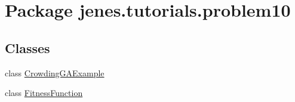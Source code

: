 \hypertarget{namespacejenes_1_1tutorials_1_1problem10}{\section{Package jenes.\-tutorials.\-problem10}
\label{namespacejenes_1_1tutorials_1_1problem10}
}
\subsection*{Classes}
\begin{DoxyCompactItemize}
\item 
class \hyperlink{classjenes_1_1tutorials_1_1problem10_1_1_crowding_g_a_example}{Crowding\-G\-A\-Example}
\item 
class \hyperlink{classjenes_1_1tutorials_1_1problem10_1_1_fitness_function}{Fitness\-Function}
\end{DoxyCompactItemize}

